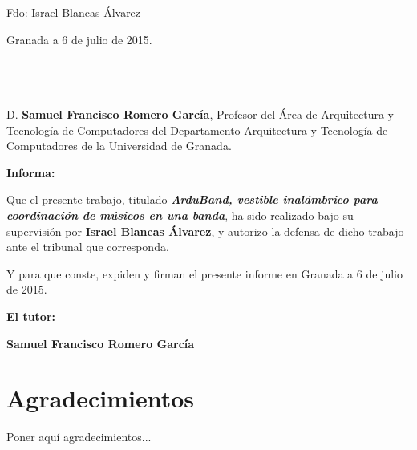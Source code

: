 \vspace{6cm}

\noindent Fdo: Israel Blancas Álvarez

\vspace{2cm}

\begin{flushright}
Granada a 6 de julio de 2015.
\end{flushright}


\chapter*{}
\thispagestyle{empty}

\noindent\rule[-1ex]{\textwidth}{2pt}\\[4.5ex]

D. \textbf{Samuel Francisco Romero García}, Profesor del Área de Arquitectura y Tecnología de Computadores del Departamento Arquitectura y Tecnología de Computadores de la Universidad de Granada.

\vspace{0.5cm}


\vspace{0.5cm}

\textbf{Informa:}

\vspace{0.5cm}

Que el presente trabajo, titulado \textit{\textbf{ArduBand, vestible inalámbrico para coordinación de músicos en una banda}},
ha sido realizado bajo su supervisión por \textbf{Israel Blancas Álvarez}, y autorizo la defensa de dicho trabajo ante el tribunal
que corresponda.

\vspace{0.5cm}

Y para que conste, expiden y firman el presente informe en Granada a 6 de julio de 2015.

\vspace{1cm}

\textbf{El tutor:}

\vspace{5cm}

\noindent \textbf{Samuel Francisco Romero García}

\chapter*{Agradecimientos}
\thispagestyle{empty}

       \vspace{1cm}


Poner aquí agradecimientos...
